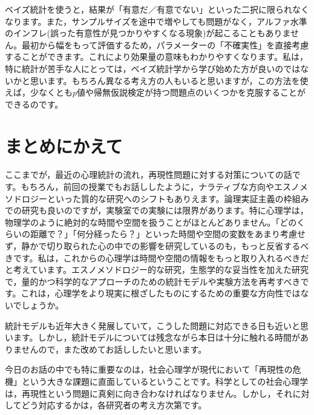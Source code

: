 \documentclass{ltjsbook}
\begin{document}
ベイズ統計を使うと，結果が「有意だ／有意でない」といった二択に限られなくなります。また，サンプルサイズを途中で増やしても問題がなく，アルファ水準のインフレ(誤った有意性が見つかりやすくなる現象)が起こることもありません。最初から幅をもって評価するため，パラメーターの「不確実性」を直接考慮することができます。これにより効果量の意味もわかりやすくなります。私は，特に統計が苦手な人にとっては，ベイズ統計学から学び始めた方が良いのではないかと思います。もちろん異なる考え方の人もいると思いますが，この方法を使えば，少なくとも$p$値や帰無仮説検定が持つ問題点のいくつかを克服することができるのです。

\section{まとめにかえて}

ここまでが，最近の心理統計の流れ，再現性問題に対する対策についての話です。もちろん，前回の授業でもお話ししたように，ナラティブな方向やエスノメソドロジーといった質的な研究へのシフトもありえます。論理実証主義の枠組みでの研究も良いのですが，実験室での実験には限界があります。特に心理学は，物理学のように絶対的な時間や空間を扱うことがほとんどありません。「どのくらいの距離で？」「何分経ったら？」といった時間や空間の変数をあまり考慮せず，静かで切り取られた心の中での影響を研究しているのも，もっと反省するべきです。私は，これからの心理学は時間や空間の情報をもっと取り入れるべきだと考えています。エスノメソドロジー的な研究，生態学的な妥当性を加えた研究で，量的かつ科学的なアプローチのための統計モデルや実験方法を再考すべきです。これは，心理学をより現実に根ざしたものにするための重要な方向性ではないでしょうか。

統計モデルも近年大きく発展していて，こうした問題に対応できる日も近いと思います。しかし，統計モデルについては残念ながら本日は十分に触れる時間がありませんので，また改めてお話ししたいと思います。

今日のお話の中でも特に重要なのは，社会心理学が現代において「再現性の危機」という大きな課題に直面しているということです。科学としての社会心理学は，再現性という問題に真剣に向き合わなければなりません。しかし，それに対してどう対応するかは，各研究者の考え方次第です。
\end{document}
